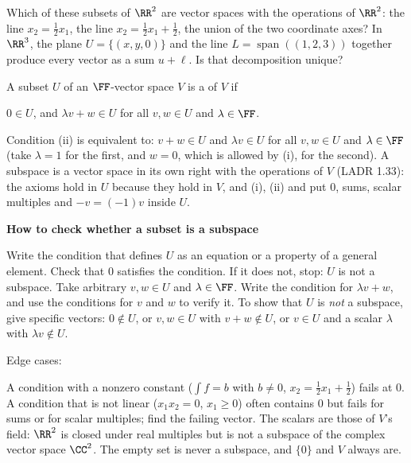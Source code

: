 \documentclass[10pt]{scrartcl}
\DeclareMathOperator{\spn}{span}
\newenvironment{methodbox}[1]{\begin{mdframed}[style=methodstyle]\textbf{\color{NavyBlue}#1}\par\vspace{2pt}}{\end{mdframed}}
\begin{document}
\begin{qbox}
  Which of these subsets of $\RR^2$ are vector spaces with the operations of $\RR^2$: the line $x_2=\tfrac12x_1$, the line $x_2=\tfrac12x_1+\tfrac12$, the union of the two coordinate axes? In $\RR^3$, the plane $U=\{(x,y,0)\}$ and the line $L=\spn((1,2,3))$ together produce every vector as a sum $u+\ell$. Is that decomposition unique?
\end{qbox}

\begin{definition*}
  A subset $U$ of an $\FF$-vector space $V$ is a  of $V$ if
  \begin{enumerate}[(i)]
    \ii $0\in U$, and
    \ii $\lambda v+w\in U$ for all $v,w\in U$ and $\lambda\in\FF$.
  \end{enumerate}
  Condition (ii) is equivalent to: $v+w\in U$ and $\lambda v\in U$ for all $v,w\in U$ and $\lambda\in\FF$ (take $\lambda=1$ for the first, and $w=0$, which is allowed by (i), for the second). A subspace is a vector space in its own right with the operations of $V$ (LADR 1.33): the axioms hold in $U$ because they hold in $V$, and (i), (ii) and  put $0$, sums, scalar multiples and $-v=(-1)v$ inside $U$.
\end{definition*}

\begin{methodbox}{How to check whether a subset is a subspace}
  \begin{steps}
    \ii Write the condition that defines $U$ as an equation or a property of a general element.
    \ii Check that $0$ satisfies the condition. If it does not, stop: $U$ is not a subspace.
    \ii Take arbitrary $v,w\in U$ and $\lambda\in\FF$. Write the condition for $\lambda v+w$, and use the conditions for $v$ and $w$ to verify it.
    \ii To show that $U$ is \emph{not} a subspace, give specific vectors: $0\notin U$, or $v,w\in U$ with $v+w\notin U$, or $v\in U$ and a scalar $\lambda$ with $\lambda v\notin U$.
  \end{steps}
  Edge cases:
  \begin{itemize}
    \ii A condition with a nonzero constant ($\int f=b$ with $b\ne0$, $x_2=\tfrac12x_1+\tfrac12$) fails at $0$.
    \ii A condition that is not linear ($x_1x_2=0$, $x_1\ge0$) often contains $0$ but fails for sums or for scalar multiples; find the failing vector.
    \ii The scalars are those of $V$'s field: $\RR^2$ is closed under real multiples but is not a subspace of the complex vector space $\CC^2$.
    \ii The empty set is never a subspace, and $\{0\}$ and $V$ always are.
  \end{itemize}
\end{methodbox}
\end{document}
